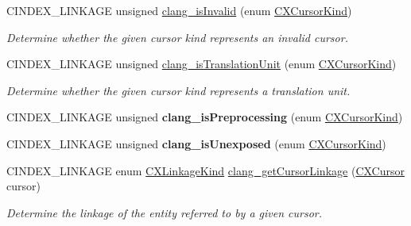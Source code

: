 \begin{DoxyCompactItemize}
C\+I\+N\+D\+E\+X\+\_\+\+L\+I\+N\+K\+A\+GE unsigned \hyperlink{group__CINDEX__CURSOR__MANIP_ga86d525c70189f9d04caf5aa59121c384}{clang\+\_\+is\+Invalid} (enum \hyperlink{group__CINDEX_gaaccc432245b4cd9f2d470913f9ef0013}{C\+X\+Cursor\+Kind})
\begin{DoxyCompactList}\small\item\em Determine whether the given cursor kind represents an invalid cursor. \end{DoxyCompactList}\item 
\mbox{\label{group__CINDEX__CURSOR__MANIP_gaa25633b28eb4799da0952e9beb03799b}} 
C\+I\+N\+D\+E\+X\+\_\+\+L\+I\+N\+K\+A\+GE unsigned \hyperlink{group__CINDEX__CURSOR__MANIP_gaa25633b28eb4799da0952e9beb03799b}{clang\+\_\+is\+Translation\+Unit} (enum \hyperlink{group__CINDEX_gaaccc432245b4cd9f2d470913f9ef0013}{C\+X\+Cursor\+Kind})
\begin{DoxyCompactList}\small\item\em Determine whether the given cursor kind represents a translation unit. \end{DoxyCompactList}\item 
\mbox{\label{group__CINDEX__CURSOR__MANIP_gab2c617ece02f6e3f41e403b8c7d85bce}} 
C\+I\+N\+D\+E\+X\+\_\+\+L\+I\+N\+K\+A\+GE unsigned {\bfseries clang\+\_\+is\+Preprocessing} (enum \hyperlink{group__CINDEX_gaaccc432245b4cd9f2d470913f9ef0013}{C\+X\+Cursor\+Kind})
\item 
\mbox{\label{group__CINDEX__CURSOR__MANIP_ga838c465c6d1e681d2469eaa5adffcceb}} 
C\+I\+N\+D\+E\+X\+\_\+\+L\+I\+N\+K\+A\+GE unsigned {\bfseries clang\+\_\+is\+Unexposed} (enum \hyperlink{group__CINDEX_gaaccc432245b4cd9f2d470913f9ef0013}{C\+X\+Cursor\+Kind})
\item 
\mbox{\label{group__CINDEX__CURSOR__MANIP_ga359dae25aa1a71176a5e33f3c7ee1740}} 
C\+I\+N\+D\+E\+X\+\_\+\+L\+I\+N\+K\+A\+GE enum \hyperlink{group__CINDEX__CURSOR__MANIP_gace57c68a7a11b0967b184a7ef9fbeb9e}{C\+X\+Linkage\+Kind} \hyperlink{group__CINDEX__CURSOR__MANIP_ga359dae25aa1a71176a5e33f3c7ee1740}{clang\+\_\+get\+Cursor\+Linkage} (\hyperlink{structCXCursor}{C\+X\+Cursor} cursor)
\begin{DoxyCompactList}\small\item\em Determine the linkage of the entity referred to by a given cursor. \end{DoxyCompactList}\item 

\end{DoxyCompactItemize}
